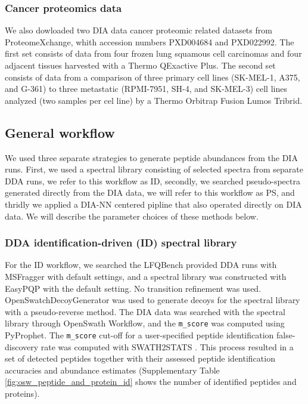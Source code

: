 \documentclass[10pt,letterpaper]{article}
\begin{document}
\subsubsection*{Cancer proteomics data}
We also dowloaded two DIA data cancer proteomic related datasets from ProteomeXchange, whith accession numbers PXD004684 and PXD022992.  
The first set consists of data from four frozen lung squamous cell carcinomas and four adjacent tissues harvested with a Thermo QExactive Plus\cite{stewart2017relative}. The second set consists of data from a comparison of three primary cell lines (SK-MEL-1, A375, and G-361) to three metastatic (RPMI-7951, SH-4, and SK-MEL-3) cell lines analyzed (two samples per cel line) by a Thermo Orbitrap Fusion Lumos Tribrid.

\subsection*{General workflow}

We used three separate strategies to generate peptide abundances from the DIA runs. First, we used a spectral library consisting of selected spectra from separate DDA runs, we refer to this workflow as ID, secondly, we searched pseudo-spectra generated directly from the DIA data, we will refer to this workflow as PS, and thridly we applied a DIA-NN centered pipline that also operated directly on DIA data.  We will describe the parameter choices of these methods below.


\subsubsection*{DDA identification-driven (ID) spectral library}

For the ID workflow, we searched the LFQBench provided DDA runs with MSFragger\cite{kong2017msfragger} with default settings, and a spectral library was constructed with EasyPQP \cite{easypqp} with the default setting. No transition refinement was used. OpenSwatchDecoyGenerator was used to generate decoys for the spectral library with a pseudo-reverse method. The DIA data was searched with the spectral library through OpenSwath Workflow, and the \texttt{m\_score} was computed using PyProphet\cite{teleman2015diana}. The \texttt{m\_score} cut-off for a user-specified peptide identification false-discovery rate was computed with SWATH2STATS \cite{blattmann2016swath2stats}. This process resulted in a set of detected peptides together with their assessed peptide identification accuracies and abundance estimates (Supplementary Table \ref{fig:osw_peptide_and_protein_id} shows the number of identified peptides and proteins).
\end{document}
